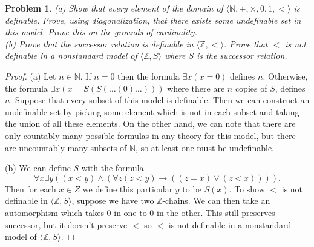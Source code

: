 \documentclass{article}
\newtheorem{problem}{Problem}
\begin{document}
\begin{problem}
(a) Show that every element of the domain of $\langle \mathbb{N}, +, \times, 0, 1, < \rangle$ is definable. Prove, using diagonalization, that there exists some undefinable set in this model. Prove this on the grounds of cardinality.\\
(b) Prove that the successor relation is definable in $\langle \mathbb{Z}, < \rangle$. Prove that $<$ is not definable in a nonstandard model of $\langle \mathbb{Z}, S \rangle$ where $S$ is the successor relation.
\end{problem}
\begin{proof}
(a) Let $n \in \mathbb{N}$. If $n = 0$ then the formula $\exists x (x = 0)$ defines $n$. Otherwise, the formula $\exists x (x = S(S(\dots (0) \dots )))$ where there are $n$ copies of $S$, defines $n$. Suppose that every subset of this model is definable. Then we can construct an undefinable set by picking some element which is not in each subset and taking the union of all these elements. On the other hand, we can note that there are only countably many possible formulas in any theory for this model, but there are uncountably many subsets of $\mathbb{N}$, so at least one must be undefinable.

(b) We can define $S$ with the formula
\[
\forall x \exists y ((x < y) \wedge (\forall z (z < y) \rightarrow ((z = x) \vee (z < x)))).
\]
Then for each $x \in Z$ we define this particular $y$ to be $S(x)$. To show $<$ is not definable in $\langle \mathbb{Z}, S \rangle$, suppose we have two $\mathbb{Z}$-chains. We can then take an automorphism which takes $0$ in one to $0$ in the other. This still preserves successor, but it doesn't preserve $<$ so $<$ is not definable in a nonstandard model of $\langle \mathbb{Z}, S \rangle$.
\end{proof}
\end{document}
